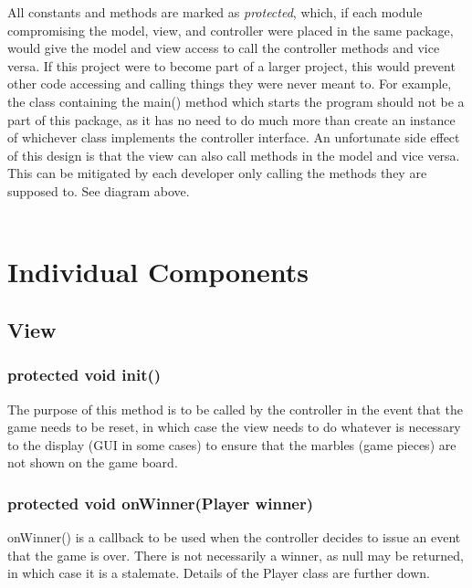 \documentclass{article}
\begin{document}
All constants and methods are marked as \textit{protected}, which, if each module compromising the model, view, and controller were placed in the same package, would give the model and view access to call the controller methods and vice versa. If this project were to become part of a larger project, this would prevent other code accessing and calling things they were never meant to. For example, the class containing the main() method which starts the program should not be a part of this package, as it has no need to do much more than create an instance of whichever class implements the controller interface. An unfortunate side effect of this design is that the view can also call methods in the model and vice versa. This can be mitigated by each developer only calling the methods they are supposed to. See diagram above.\\\\

\section{Individual Components}

\subsection{View}

\subsubsection*{protected void init()}
The purpose of this method is to be called by the controller in the event that the game needs to be reset, in which case the view needs to do whatever is necessary to the display (GUI in some cases) to ensure that the marbles (game pieces) are not shown on the game board.

\subsubsection*{protected void onWinner(Player winner)}
onWinner() is a callback to be used when the controller decides to issue an event that the game is over. There is not necessarily a winner, as null may be returned, in which case it is a stalemate. Details of the Player class are further down.
\end{document}
